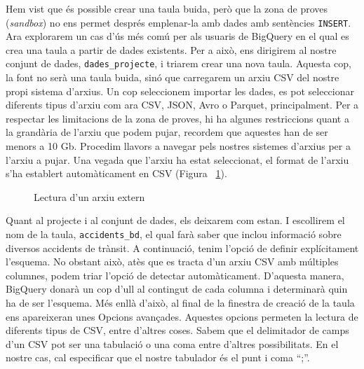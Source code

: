 \documentclass[12pt,longbibliography]{article}
\theoremstyle{definition}
\theoremstyle{remark}
\begin{document}
Hem vist que és possible crear una taula buida, però que la zona de proves (\textit{sandbox}) no ens permet després emplenar-la amb dades amb sentències \verb|INSERT|. Ara explorarem un cas d'ús més comú per als usuaris de BigQuery en el qual es crea una taula a partir de dades existents. Per a això, ens dirigirem al nostre conjunt de dades, \verb|dades_projecte|, i triarem crear una nova taula. Aquesta cop, la font no serà una taula buida, sinó que carregarem un arxiu CSV del nostre propi sistema d'arxius. Un cop seleccionem importar les dades, es pot seleccionar diferents tipus d'arxiu com ara CSV, JSON, Avro o Parquet, principalment. Per a respectar les limitacions de la zona de proves, hi ha algunes restriccions quant a la grandària de l'arxiu que podem pujar, recordem que aquestes han de ser menors a 10 Gb. Procedim llavors a navegar pels nostres sistemes d'arxius per a l'arxiu a pujar. Una vegada que l'arxiu ha estat seleccionat, el format de l'arxiu s'ha establert automàticament en CSV (Figura ~\ref{fig:bq12}). 

\vspace{2mm}
\begin{figure}[h!]
\par
{}%
\hfill
{}%
\par

\caption{Lectura d'un arxiu extern}
\label{fig:bq12}
\end{figure}
\vspace{2mm}

Quant al projecte i al conjunt de dades, els deixarem com estan. I escollirem el nom de la taula, \verb|accidents_bd|, el qual farà saber que inclou informació sobre diversos accidents de trànsit. A continuació, tenim l'opció de definir explícitament l'esquema. No obstant això, atès que es tracta d'un arxiu CSV amb múltiples columnes, podem triar l'opció de detectar automàticament. D'aquesta manera, BigQuery donarà un cop d'ull al contingut de cada columna i determinarà quin ha de ser l'esquema. Més enllà d'això, al final de la finestra de creació de la taula ens apareixeran unes Opcions avançades. Aquestes opcions permeten la lectura de diferents tipus de CSV, entre d’altres coses. Sabem que el delimitador de camps d’un CSV pot ser una tabulació o una coma entre d’altres possibilitats. En el nostre cas, cal especificar que el nostre tabulador és el punt i coma “;”. 
\end{document}
